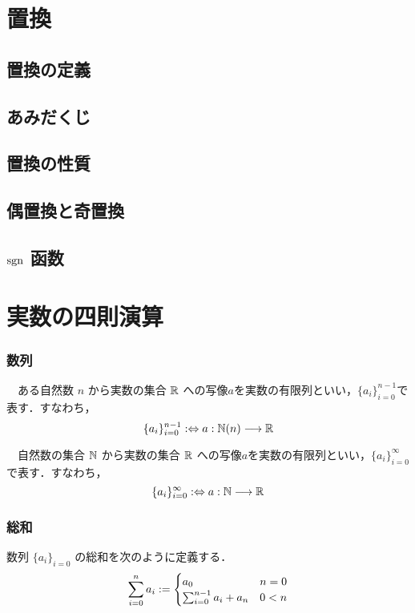 \documentclass{book} %
\begin{document}
			\section{置換}
				\subsection{置換の定義}
				\subsection{あみだくじ}
				\subsection{置換の性質}
				\subsection{偶置換と奇置換}
				\subsection{$\operatorname{\mathrm{sgn}}$ 函数}
			\section{実数の四則演算}
					
					\subsubsection{数列}
					\begin{dfn}[有限列]　ある自然数 $n$ から実数の集合 $\mathbb{R}$ への写像$a$を実数の有限列といい，$\{ a_{i} \}_{i=0}^{n-1}$で表す．すなわち，
						\begin{equation}
							\{a_i\}_{i=0}^{n-1} :\Leftrightarrow a: \mathbb{N}(n) \longrightarrow \mathbb{R}
						\end{equation}
					\end{dfn}
					\begin{dfn}[無限列]　自然数の集合 $\mathbb{N}$ から実数の集合 $\mathbb{R}$ への写像$a$を実数の有限列といい，$\{ a_{i} \}_{i=0}^{\infty}$で表す．すなわち，
						\begin{equation}
							\{a_i\}_{i=0}^{\infty} :\Leftrightarrow a: \mathbb{N} \longrightarrow \mathbb{R}
						\end{equation}
					\end{dfn}
				
					\subsubsection{総和}
						\begin{dfn} 数列 $\{a_i\}_{i=0}$ の総和を次のように定義する．
							\begin{equation}
								\sum_{i=0}^{n} a_i := \begin{cases}
									a_0 & n = 0 \\
									\sum_{i=0}^{n-1} a_i + a_{n} &  0 < n
								\end{cases}
							\end{equation}
						\end{dfn}
					
\end{document}

